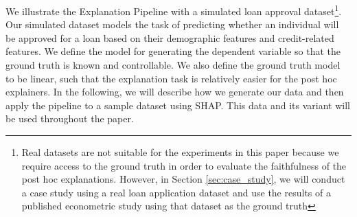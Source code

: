 \documentclass[mnsc,blindrev]{informs3}
\begin{document}
    We illustrate the Explanation Pipeline with a simulated loan approval dataset\footnote{Real datasets are not suitable for the experiments in this paper because we require access to the ground truth in order to evaluate the faithfulness of the post hoc explanations. However, in Section \ref{sec:case_study}, we will conduct a case study using a real loan application dataset and use the results of a published econometric study using that dataset as the ground truth}. Our simulated dataset models the task of predicting whether an individual will be approved for a loan based on their demographic features and credit-related features. We define the model for generating the dependent variable so that the ground truth is known and controllable. We also define the ground truth model to be linear, such that the explanation task is relatively easier for the post hoc explainers. %
    In the following, we will describe how we generate our data and then apply the pipeline to a sample dataset using SHAP. This data and its variant will be used throughout the paper. %
\end{document}
